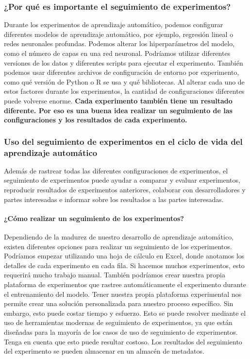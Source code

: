\documentclass[10pt]{book}
\begin{document}
\subsubsection{¿Por qué es importante el seguimiento de experimentos?}
Durante los experimentos de aprendizaje automático, podemos configurar diferentes modelos de aprendizaje automático, por ejemplo, regresión lineal o redes neuronales profundas. Podemos alterar los hiperparámetros del modelo, como el número de capas en una red neuronal. Podríamos utilizar diferentes versiones de los datos y diferentes scripts para ejecutar el experimento. También podemos usar diferentes archivos de configuración de entorno por experimento, como qué versión de Python o R se usa y qué bibliotecas. Al alterar cada uno de estos factores durante los experimentos, la cantidad de configuraciones diferentes puede volverse enorme. \textbf{Cada experimento también tiene un resultado diferente. Por eso es una buena idea realizar un seguimiento de las configuraciones y los resultados de cada experimento.}

\subsubsection{Uso del seguimiento de experimentos en el ciclo de vida del aprendizaje automático}
Además de rastrear todas las diferentes configuraciones de experimentos, el seguimiento de experimentos puede ayudar a comparar y evaluar experimentos, reproducir resultados de experimentos anteriores, colaborar con desarrolladores y partes interesadas e informar sobre los resultados a las partes interesadas.

\paragraph{¿Cómo realizar un seguimiento de los experimentos?}
Dependiendo de la madurez de nuestro desarrollo de aprendizaje automático, existen diferentes opciones para realizar un seguimiento de los experimentos. Podríamos empezar utilizando una hoja de cálculo en Excel, donde anotamos los detalles de cada experimento en cada fila. Si hacemos muchos experimentos, esto requerirá mucho trabajo manual. También podríamos crear nuestra propia plataforma de experimentos que rastree automáticamente el experimento durante el entrenamiento del modelo. Tener nuestra propia plataforma experimental nos permite crear una solución personalizada para nuestro proceso específico. Sin embargo, esto puede costar tiempo y esfuerzo. Esto se puede resolver mediante el uso de herramientas modernas de seguimiento de experimentos, ya que están diseñadas para la mayoría de los casos de uso de seguimiento de experimentos. Tenga en cuenta que esto puede resultar costoso. Los resultados del seguimiento del experimento se pueden almacenar en un almacén de metadatos.
\end{document}
